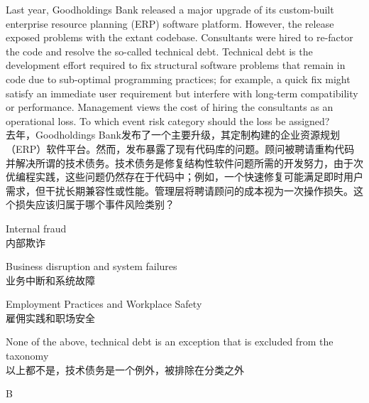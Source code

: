 \documentclass{article}
\newcounter{question} %
\begin{document}
\begin{question}
    Last year, Goodholdings Bank released a major upgrade of its custom-built enterprise resource planning (ERP) software platform. However, the release exposed problems with the extant codebase. Consultants were hired to re-factor the code and resolve the so-called technical debt. Technical debt is the development effort required to fix structural software problems that remain in code due to sub-optimal programming practices; for example, a quick fix might satisfy an immediate user requirement but interfere with long-term compatibility or performance. Management views the cost of hiring the consultants as an operational loss. To which event risk category should the loss be assigned?
    \\去年，Goodholdings Bank发布了一个主要升级，其定制构建的企业资源规划（ERP）软件平台。然而，发布暴露了现有代码库的问题。顾问被聘请重构代码并解决所谓的技术债务。技术债务是修复结构性软件问题所需的开发努力，由于次优编程实践，这些问题仍然存在于代码中；例如，一个快速修复可能满足即时用户需求，但干扰长期兼容性或性能。管理层将聘请顾问的成本视为一次操作损失。这个损失应该归属于哪个事件风险类别？
\end{question}

\begin{choices}
    \item Internal fraud\\内部欺诈
    \item Business disruption and system failures\\业务中断和系统故障
    \item Employment Practices and Workplace Safety\\雇佣实践和职场安全
    \item None of the above, technical debt is an exception that is excluded from the taxonomy\\以上都不是，技术债务是一个例外，被排除在分类之外
\end{choices}

\begin{correctanswer}
    B
\end{correctanswer}
\end{document}
